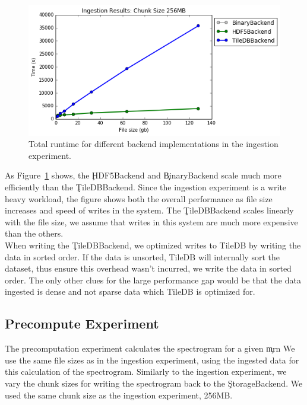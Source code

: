 \begin{figure}[h]
\begin{center}
\includegraphics[scale=.75]{./img/ingestion-exp.png}
\caption{Total runtime for different backend implementations in the ingestion
  experiment.}
\label{fig:ingestion-exp}
\end{center}
\end{figure}

As Figure~\ref{fig:ingestion-exp} shows, the \c{HDF5Backend} and
\c{BinaryBackend} scale much more efficiently than the \c{TileDBBackend}. Since
the ingestion experiment is a write heavy workload, the figure shows both the
overall performance as file size increases and speed of writes in the system.
The \c{TileDBBackend} scales linearly with the file size, we assume that writes
in this system are much more expensive than the others. \\

When writing the \c{TileDBBackend}, we optimized writes to TileDB by writing
the data in sorted order. If the data is unsorted, TileDB will internally sort
the dataset, thus ensure this overhead wasn't incurred, we write the data in
sorted order. The only other clues for the large performance gap would be that
the data ingested is dense and not sparse data which TileDB is optimized for.

\subsection{Precompute Experiment}\label{storage-ch:precompute-exp}

The precomputation experiment calculates the spectrogram for a given \c{mrn} We
use the same file sizes as in the ingestion experiment, using the ingested data
for this calculation of the spectrogram. Similarly to the ingestion experiment,
we vary the chunk sizes for writing the spectrogram back to the
\c{StorageBackend}. We used the same chunk size as the ingestion experiment,
256MB. \\

